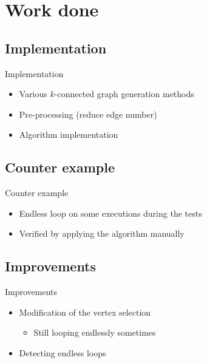 \section{Work done}

\subsection{Implementation}
\begin{frame}{Implementation}
	\begin{itemize}
  \item Various $k$-connected graph generation methods
  \item Pre-processing (reduce edge number)
  \item Algorithm implementation
	\end{itemize}
\end{frame}

\subsection{Counter example}
\begin{frame}{Counter example}
  \begin{itemize}
  \item Endless loop on some executions during the tests
  \item Verified by applying the algorithm manually
  \end{itemize}
\end{frame}


\subsection{Improvements}
\begin{frame}{Improvements}
  \begin{itemize}
  \item Modification of the vertex selection
    \begin{itemize}
    \item Still looping endlessly sometimes
    \end{itemize}
  \item Detecting endless loops
  \end{itemize}
\end{frame}

%
